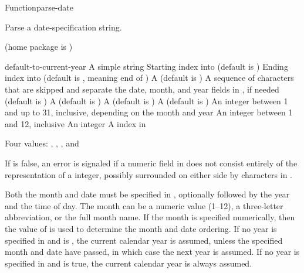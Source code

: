 \documentclass[10pt,twoside,english,pdftex]{article}
\begin{document}
\begin{functiondoc}{Function}{parse-date}{%
     
    }
% 

\fnsyntax

\fnpurpose Parse a date-specification string.

\fnpackage {} (home package is )

\fnmodule {}

\fnargs
\begin{args}{default-to-current-year}
\arg[string] A simple string
\arg[start] Starting index into  (default is )
\arg[end] Ending index into  (default is \nil, meaning
end of )
 A  (default is \nil)
\arg[separators] A sequence of characters that are skipped and separate the
 date, month, and year fields in , if needed (default is 
 )
 A  (default is 
)
 A  (default is
)
 A  (default is \nil)
\arg[date] An integer between 1 and up to 31, inclusive, depending
  on the month and year
\arg[month] An integer between 1 and 12, inclusive
\arg[year] An integer
\arg[position] A index in 
\end{args}

\fnreturns Four values: , , , and

\fnerrors
%
If  is false, an error is signaled if a numeric field in
 does not consist entirely of the representation of a integer,
possibly surrounded on either side by characters in .

\fndescription
%
Both the month and date must be specified in , optionally followed
by the year and the time of day. The month can be a numeric value (1--12), a
three-letter abbreviation, or the full month name.  If the month is specified
numerically, then the value of  is used to
determine the month and date ordering. If no year is specified in 
and  is \nil, the current calendar year
is assumed, unless the specified month and date have passed, in which case the
next year is assumed. If no year is specified in  and
 is true, the current calendar year is
always assumed.


\end{functiondoc}
\end{document}
